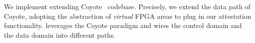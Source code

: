 







We implement \projecttitle{} extending Coyote~\cite{coyote} codebase. Precisely, we extend the data path of Coyote, adopting the abstraction of {\em virtual} FPGA areas to plug in our attestation functionality. \projecttitle{} leverages the Coyote paradigm and wires the control domain and the data domain into different paths.

